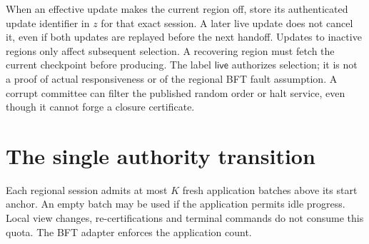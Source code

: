 \documentclass[11pt,a4paper]{article}
\newcommand{\Tag}[1]{\ensuremath{\mathsf{#1}}}
\begin{document}
When an effective update makes the current region off, store its authenticated
update identifier in $z$ for that exact session. A later live update does
not cancel it, even if both updates are replayed before the next handoff.
Updates to inactive regions only affect subsequent selection. A recovering
region must fetch the current checkpoint before producing. The label
\Tag{live} authorizes selection; it is not a proof of actual responsiveness
or of the regional BFT fault assumption. A corrupt committee can filter
the published random order or halt service, even though it cannot forge
a closure certificate.

\section{The single authority transition}
\label{sec:transition}

Each regional session admits at most $K$ fresh application batches above
its start anchor. An empty batch may be used if the application permits
idle progress. Local view changes, re-certifications and terminal commands
do not consume this quota. The BFT adapter enforces the application count.
\end{document}

